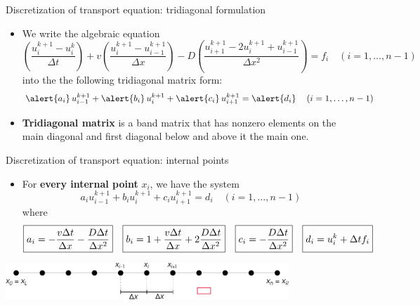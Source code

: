\begin{frame}{Discretization of transport equation: tridiagonal formulation}
\begin{itemize}
\item We write the algebraic equation
\[
\left(\frac{u_{i}^{k+1}-u_{i}^{k}}{\Delta t}\right)+v\left(\frac{u_{i}^{k+1}-u_{i-1}^{k+1}}{\Delta x}\right)-D\left(\frac{u_{i+1}^{k+1}-2u_{i}^{k+1}+u_{i-1}^{k+1}}{\Delta x^{2}}\right)=f_{i}\quad(i=1,\ldots,n-1)
\]
into the the following tridiagonal matrix form:
\[
\alert{a_{i}}\, u_{i-1}^{k+1}+
\alert{b_{i}}\, u_{i}^{k+1}+
\alert{c_{i}}\, u_{i+1}^{k+1}=
\alert{d_{i}}\, \quad(i=1,\ldots,n-1)
\]
\item \alert{\bf Tridiagonal matrix} is a band matrix that has nonzero elements on the main diagonal and first diagonal below and above it the main one.
%
\end{itemize}

\end{frame}
%
%
\begin{frame}{Discretization of transport equation: internal points}

\begin{itemize}
\item For \alert{\bf every internal point} $x_{i}$, we have the system
\[
a_{i}u_{i-1}^{k+1}+b_{i}u_{i}^{k+1}+c_{i}u_{i+1}^{k+1}=d_{i}\quad(i=1,\ldots,n-1)
\]
where
\[
\boxed{a_{i}=-\frac{v\Delta t}{\Delta x}-\frac{D\Delta t}{\Delta x^{2}}}\quad\boxed{b_{i}=1+\frac{v\Delta t}{\Delta x}+2\frac{D\Delta t}{\Delta x^{2}}}\quad\boxed{c_{i}=-\frac{D\Delta t}{\Delta x^{2}}}\quad\boxed{d_{i}=u_{i}^{k}+\Delta tf_{i}\vphantom{\frac{D\Delta t}{\Delta x^{2}}}}
\]
\end{itemize}
\vskip 10pt
\begin{center}
	\includegraphics[width=0.8\textwidth]{figures/reactive-transport/finite-difference-domain-discretization}
\par\end{center}
\end{frame}
